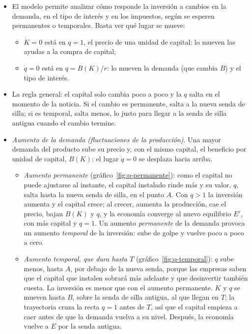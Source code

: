 \documentclass[11pt]{article}
\begin{document}
\begin{itemize}
\item El modelo permite analizar cómo responde la inversión a cambios en la demanda, en el tipo de interés y en los impuestos, según se esperen permanentes o temporales. Basta ver qué lugar se mueve:
  \begin{itemize}
  \item $\dot K=0$ está en $q=1$, el precio de una unidad de capital: lo mueven las ayudas a la compra de capital;
  \item $\dot q=0$ está en $q=B(K)/r$: lo mueven la demanda (que cambia $B$) y el tipo de interés.
  \end{itemize}
\item La regla general: el capital solo cambia poco a poco y la $q$ salta en el momento de la noticia. Si el cambio es permanente, salta a la nueva senda de silla; si es temporal, salta menos, lo justo para llegar a la senda de silla antigua cuando el cambio termine.
\item \emph{Aumento de la demanda (fluctuaciones de la producción)}. Una mayor demanda del producto sube su precio y, con el mismo capital, el beneficio por unidad de capital, $B(K)$: el lugar $\dot q=0$ se desplaza hacia arriba.
  \begin{itemize}
  \item \emph{Aumento permanente} (gráfico~\ref{fig:q-permanente}): como el capital no puede ajustarse al instante, el capital instalado rinde más y su valor, $q$, salta hasta la nueva senda de silla, en el punto $A$. Con $q>1$ la inversión aumenta y el capital crece; al crecer, aumenta la producción, cae el precio, bajan $B(K)$ y $q$, y la economía converge al nuevo equilibrio $E'$, con más capital y $q=1$. Un aumento \emph{permanente} de la demanda provoca un aumento \emph{temporal} de la inversión: sube de golpe y vuelve poco a poco a cero.
  \item \emph{Aumento temporal, que dura hasta $T$} (gráfico~\ref{fig:q-temporal}): $q$ sube menos, hasta $A$, por debajo de la nueva senda, porque las empresas saben que el capital que instalen sobrará más adelante y que desinvertir también cuesta. La inversión es menor que con el aumento permanente. $K$ y $q$ se mueven hasta $B$, sobre la senda de silla antigua, al que llegan en $T$; la trayectoria cruza la recta $q=1$ antes de $T$, así que el capital empieza a caer antes de que la demanda vuelva a su nivel. Después, la economía vuelve a $E$ por la senda antigua.
  \end{itemize}
\end{itemize}
\end{document}
